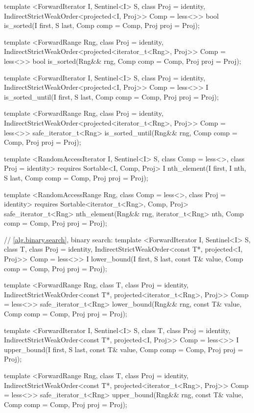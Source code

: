 \begin{codeblock}
{{{{  template <ForwardIterator I, Sentinel<I> S, class Proj = identity,
      IndirectStrictWeakOrder<projected<I, Proj>> Comp = less<>>
    bool is_sorted(I first, S last, Comp comp = Comp{}, Proj proj = Proj{});

  template <ForwardRange Rng, class Proj = identity,
      IndirectStrictWeakOrder<projected<iterator_t<Rng>, Proj>> Comp = less<>>
    bool
      is_sorted(Rng&& rng, Comp comp = Comp{}, Proj proj = Proj{});

  template <ForwardIterator I, Sentinel<I> S, class Proj = identity,
      IndirectStrictWeakOrder<projected<I, Proj>> Comp = less<>>
    I is_sorted_until(I first, S last, Comp comp = Comp{}, Proj proj = Proj{});

  template <ForwardRange Rng, class Proj = identity,
      IndirectStrictWeakOrder<projected<iterator_t<Rng>, Proj>> Comp = less<>>
    safe_iterator_t<Rng>
      is_sorted_until(Rng&& rng, Comp comp = Comp{}, Proj proj = Proj{});

  template <RandomAccessIterator I, Sentinel<I> S, class Comp = less<>,
      class Proj = identity>
    requires Sortable<I, Comp, Proj>
    I nth_element(I first, I nth, S last, Comp comp = Comp{}, Proj proj = Proj{});

  template <RandomAccessRange Rng, class Comp = less<>, class Proj = identity>
    requires Sortable<iterator_t<Rng>, Comp, Proj>
    safe_iterator_t<Rng>
      nth_element(Rng&& rng, iterator_t<Rng> nth, Comp comp = Comp{}, Proj proj = Proj{});

  // \ref{alg.binary.search}, binary search:
  template <ForwardIterator I, Sentinel<I> S, class T, class Proj = identity,
      IndirectStrictWeakOrder<const T*, projected<I, Proj>> Comp = less<>>
    I
      lower_bound(I first, S last, const T& value, Comp comp = Comp{},
                  Proj proj = Proj{});

  template <ForwardRange Rng, class T, class Proj = identity,
      IndirectStrictWeakOrder<const T*, projected<iterator_t<Rng>, Proj>> Comp = less<>>
    safe_iterator_t<Rng>
      lower_bound(Rng&& rng, const T& value, Comp comp = Comp{}, Proj proj = Proj{});

  template <ForwardIterator I, Sentinel<I> S, class T, class Proj = identity,
      IndirectStrictWeakOrder<const T*, projected<I, Proj>> Comp = less<>>
    I
      upper_bound(I first, S last, const T& value, Comp comp = Comp{}, Proj proj = Proj{});

  template <ForwardRange Rng, class T, class Proj = identity,
      IndirectStrictWeakOrder<const T*, projected<iterator_t<Rng>, Proj>> Comp = less<>>
    safe_iterator_t<Rng>
      upper_bound(Rng&& rng, const T& value, Comp comp = Comp{}, Proj proj = Proj{});

}}}}
\end{codeblock}

